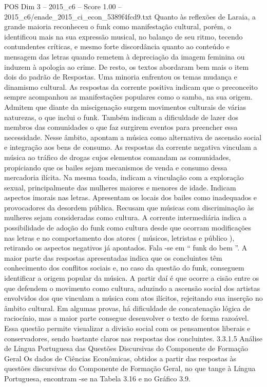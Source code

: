 \begin{textsample}{POS Dim 3 – 2015\_c6 – Score 1.00 – 2015\_c6/enade\_2015\_ci\_econ\_5389f4fcd9.txt}
Quanto às reflexões de Laraia, a grande maioria reconheceu o funk como manifestação cultural, porém, o identificou mais na sua expressão musical, no balanço de seu ritmo, tecendo contundentes críticas, e mesmo forte discordância quanto ao conteúdo e mensagem das letras quando remetem à depreciação da imagem feminina ou induzem à apologia ao crime.
De resto, os textos abordaram bem mais o item dois do padrão de Respostas.
Uma minoria enfrentou os temas mudança e dinamismo cultural.
As respostas da corrente positiva indicam que o preconceito sempre acompanhou as manifestações populares como o samba, na sua origem.
Admitem que diante da miscigenação surgem movimentos culturais de várias naturezas, o que inclui o funk.
Também indicam a dificuldade de lazer dos membros das comunidades o que faz surgirem eventos para preencher essa necessidade.
Nesse âmbito, apontam a música como alternativa de ascensão social e integração aos bens de consumo.
As respostas da corrente negativa vinculam a música ao tráfico de drogas cujos elementos comandam as comunidades, propiciando que os bailes sejam mecanismos de venda e consumo dessa mercadoria ilícita.
Na mesma toada, indicam a vinculação com a exploração sexual, principalmente das mulheres maiores e menores de idade.
Indicam aspectos imorais nas letras.
Apresentam os locais dos bailes como inadequados e provocadores da desordem pública.
Recusam que músicas com discriminação às mulheres sejam consideradas como cultura.
A corrente intermediária indica a possibilidade de adoção do funk como cultura desde que ocorram modificações nas letras e no comportamento dos atores ( músicos, letristas e público ), retirando os aspectos negativos já apontados.
Fala -se em “ funk do bem ”.
A maior parte das respostas apresentadas indica que os concluintes têm conhecimento dos conflitos sociais e, no caso da questão do funk, conseguem identificar a origem popular da música.
A partir daí é que ocorre a cisão entre os que defendem o movimento como cultura, aduzindo a ascensão social dos artistas envolvidos dos que vinculam a música com atos ilícitos, rejeitando sua inserção no âmbito cultural.
Em algumas provas, há dificuldade de concatenação lógica de raciocínio, mas a maior parte consegue desenvolver o texto de forma razoável.
Essa questão permite visualizar a divisão social com os pensamentos liberais e conservadores, sendo bastante claros nas respostas dos concluintes. 3.3.1.5 Análise de Língua Portuguesa das Questões Discursivas do Componente de Formação Geral Os dados de Ciências Econômicas, obtidos a partir das respostas às questões discursivas do Componente de Formação Geral, no que tange à Língua Portuguesa, encontram -se na Tabela 3.16 e no Gráfico 3.9.

\end{textsample}
